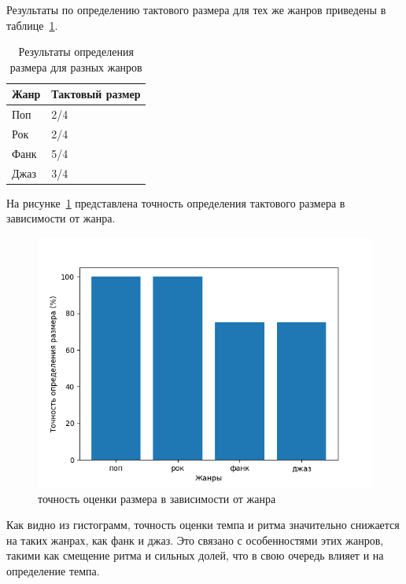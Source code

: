 \newpage

Результаты по определению тактового размера для тех же жанров приведены в таблице~\ref{tab:rhythm_genres}.

\begin{table}[!h]
	\begin{center}
		\caption{\label{tab:rhythm_genres}Результаты определения размера для разных жанров}
		\begin{tabular}{|p{8cm}|p{8cm}|}
			\hline
			\textbf{Жанр} & \textbf{Тактовый размер}\\
			\hline
			Поп & 2/4\\
			\hline
			Рок & 2/4\\
			\hline
			Фанк & 5/4\\
			\hline
			Джаз & 3/4\\
			\hline
		\end{tabular}
	\end{center}
\end{table}

На рисунке~\ref{img:measure_genres} представлена точность определения тактового размера в зависимости от жанра.

\begin{figure}[h]
	\centering
	\includegraphics[scale=1]{../graphs/measure_genres.png}
	\caption{точность оценки размера в зависимости от жанра}
	\label{img:measure_genres}
\end{figure}

\newpage

Как видно из гистограмм, точность оценки темпа и ритма значительно снижается на таких жанрах, как фанк и джаз. Это связано с особенностями этих жанров, такими как смещение ритма и сильных долей, что в свою очередь влияет и на определение темпа.

